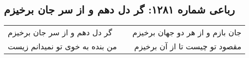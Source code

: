 \begin{center}
\section*{رباعی شماره ۱۲۸۱: گر دل دهم و از سر جان برخیزم}
\label{sec:1281}
\begin{longtable}{l p{0.5cm} r}
گر دل دهم و از سر جان برخیزم
&&
جان بازم و از هر دو جهان برخیزم
\\
من بنده به خوی تو نمیدانم زیست
&&
مقصود تو چیست تا از آن برخیزم
\\
\end{longtable}
\end{center}
